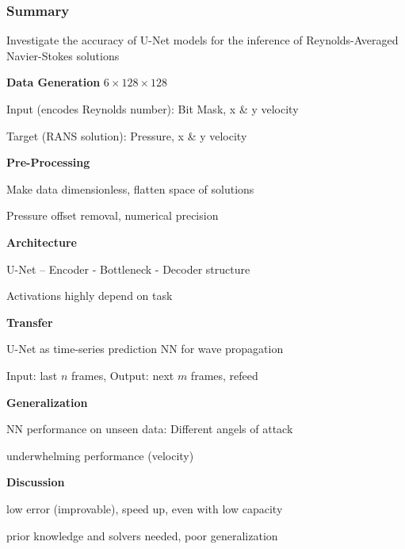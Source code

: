 \begin{frame}
    \frametitle{Summary}
	\vspace*{0.8cm}
Investigate the accuracy of U-Net models for the inference of Reynolds-Averaged Navier-Stokes solutions

\begin{multicols}{2}
    \textbf{Data Generation} $6 \times 128 \times 128$
	\begin{PraesentationAufzaehlung}
		\item Input (encodes Reynolds number): Bit Mask, x \& y velocity
		\item Target (RANS solution): Pressure, x \& y velocity
	\end{PraesentationAufzaehlung}
	
	\textbf{Pre-Processing}
	\begin{PraesentationAufzaehlung}
		\item Make data dimensionless, flatten space of solutions
		\item Pressure offset removal, numerical precision
	\end{PraesentationAufzaehlung}
	
	\textbf{Architecture}
	\begin{PraesentationAufzaehlung}
		\item U-Net -- Encoder - Bottleneck - Decoder structure
		\item Activations highly depend on task
	\end{PraesentationAufzaehlung}
	
    \vfill\columnbreak
    \textbf{Transfer} 
	\begin{PraesentationAufzaehlung}
		\item U-Net as time-series prediction NN for wave propagation
		\item Input: last $n$ frames, Output: next $m$ frames, refeed
	\end{PraesentationAufzaehlung}
	
	\textbf{Generalization}
	\begin{PraesentationAufzaehlung}
		\item NN performance on unseen data: Different angels of attack
		\item underwhelming performance (velocity)
	\end{PraesentationAufzaehlung}
	
	\textbf{Discussion}
	\begin{PraesentationAufzaehlung}
		\item low error (improvable), speed up, even with low capacity  
		\item prior knowledge and solvers needed, poor generalization
	\end{PraesentationAufzaehlung}
	
\end{multicols}
\end{frame}
\clearpage